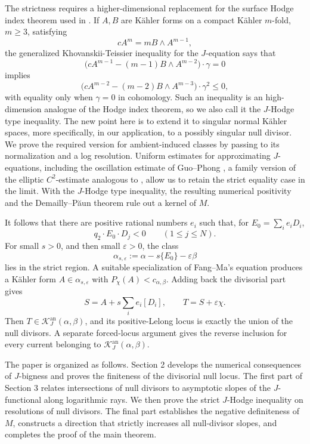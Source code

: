 \documentclass[reqno]{amsart}
\newcommand{\cab}{c_{\alpha,\beta}}
\theoremstyle{plain}
\theoremstyle{remark}
\begin{document}
The strictness requires a higher-dimensional replacement for the
surface Hodge index theorem used in \cite{3d}. If $A,B$ are
K\"ahler forms on a compact K\"ahler $m$-fold, $m\geq3$, satisfying
\[
 cA^m=mB\wedge A^{m-1},
\]
the generalized Khovanskii-Teissier inequality for the $J$-equation \cite[Theorem 2.13]{CT21} says that 
\[
 \bigl(cA^{m-1}-(m-1)B\wedge A^{m-2}\bigr)\cdot\gamma=0
\]
implies
\[
 \bigl(cA^{m-2}-(m-2)B\wedge A^{m-3}\bigr)\cdot\gamma^2\leq0,
\]
with equality only when $\gamma=0$ in cohomology. Such an inequality is an high-dimension analogue of the Hodge index theorem, so we also call it the $J$-Hodge type inequality. The new point here 
is to extend it to singular normal K\"ahler spaces, more specifically, in our application, to a possibly singular null divisor. 
We prove the required version for ambient-induced classes by passing
to its normalization and a log resolution. Uniform estimates for
approximating $J$-equations, including the oscillation estimate of
Guo--Phong \cite{GP24}, a family version of the elliptic $ C^2$-estimate analogous to \cite{T23}, allow us to retain the strict equality
case in the limit. With the $J$-Hodge type inequality, the resulting numerical positivity and the
Demailly--P\u{a}un theorem \cite{DP04} rule out a kernel of
$M$.

It follows that there are positive rational numbers $e_i$ such that,
for $E_0=\sum_i e_{i}D_i$,
\[
 q_2\cdot E_0\cdot D_j<0\qquad(1\leq j\leq N).
\]
For small $s>0$, and then small $\varepsilon>0$, the class
\[
 \alpha_{s,\varepsilon}
 :=\alpha-s\{E_0\}-\varepsilon\beta
\]
lies in the strict region. A suitable specialization of Fang--Ma's
equation \cite{FM24} produces a K\"ahler form
$A\in\alpha_{s,\varepsilon}$ with $P_\chi(A)<\cab$. Adding back
the divisorial part gives
\[
 S=A+s\sum_i e_{i}[D_i],\qquad T=S+\varepsilon\chi.
\]
Then $T\in\mathcal K_J^{\mathrm{an}}(\alpha,\beta)$, and its
positive-Lelong locus is exactly the union of the null divisors. A
separate forced-locus argument gives the reverse inclusion for every
current belonging to $\mathcal K_J^{\mathrm{an}}(\alpha,\beta)$.

The paper is organized as follows. Section 2 develops the numerical
consequences of $J$-bigness and proves the finiteness of the divisorial
null locus. The first part of Section 3 relates intersections of null
divisors to asymptotic slopes of the $J$-functional along
logarithmic rays. We then prove the strict $J$-Hodge inequality on
resolutions of null divisors. The final part establishes the negative
definiteness of $M$, constructs a direction that strictly increases
all null-divisor slopes, and completes the proof of the main theorem.
\end{document}
